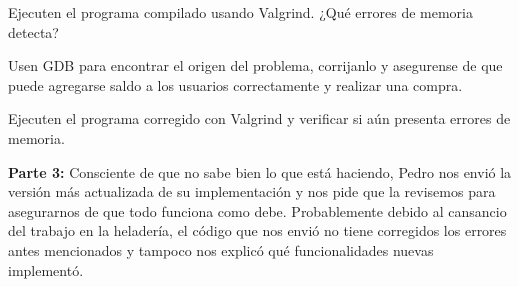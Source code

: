 \documentclass[]{scrartcl}
\begin{document}
Ejecuten el programa compilado usando Valgrind. ¿Qué errores de memoria detecta?

Usen GDB para encontrar el origen del problema, corrijanlo y asegurense de que puede agregarse saldo a los usuarios correctamente y realizar una compra.

Ejecuten el programa corregido con Valgrind y verificar si aún presenta errores de memoria.

\textbf{Parte 3:}
Consciente de que no sabe bien lo que está haciendo, Pedro nos envió la versión más actualizada de su implementación y nos pide que la revisemos para asegurarnos de que todo funciona como debe.
Probablemente debido al cansancio del trabajo en la heladería, el código que nos envió no tiene corregidos los errores antes mencionados y tampoco nos explicó qué funcionalidades nuevas implementó.
\end{document}
